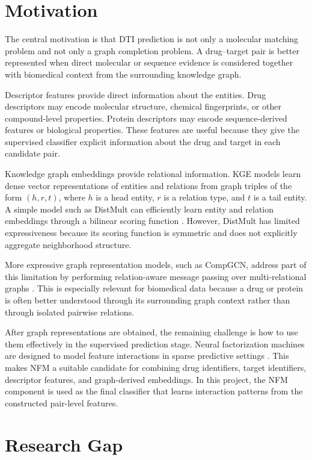 \section{Motivation}

The central motivation is that DTI prediction is not only a molecular matching
problem and not only a graph completion problem. A drug--target pair is better
represented when direct molecular or sequence evidence is considered together
with biomedical context from the surrounding knowledge graph.

Descriptor features provide direct information about the entities. Drug
descriptors may encode molecular structure, chemical fingerprints, or other
compound-level properties. Protein descriptors may encode sequence-derived
features or biological properties. These features are useful because they give
the supervised classifier explicit information about the drug and target in each
candidate pair.

Knowledge graph embeddings provide relational information. KGE models learn
dense vector representations of entities and relations from graph triples of
the form $(h,r,t)$, where $h$ is a head entity, $r$ is a relation type, and $t$
is a tail entity. A simple model such as DistMult can efficiently learn entity
and relation embeddings through a bilinear scoring function
\cite{YangYHGD14a}. However, DistMult has limited expressiveness because
its scoring function is symmetric and does not explicitly aggregate
neighborhood structure.

More expressive graph representation models, such as CompGCN, address part of
this limitation by performing relation-aware message passing over
multi-relational graphs \cite{VashishthSNT20}. This is especially
relevant for biomedical data because a drug or protein is often better
understood through its surrounding graph context rather than through isolated
pairwise relations.

After graph representations are obtained, the remaining challenge is how to use
them effectively in the supervised prediction stage. Neural factorization
machines are designed to model feature interactions in sparse predictive
settings \cite{0001C17}. This makes NFM a suitable candidate for combining
drug identifiers, target identifiers, descriptor features, and graph-derived
embeddings. In this project, the NFM component is used as the final classifier
that learns interaction patterns from the constructed pair-level features.

\section{Research Gap}

